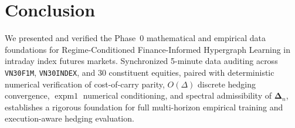 \section{Conclusion}
\label{sec:conclusion}

We presented and verified the Phase~0 mathematical and empirical data foundations for Regime-Conditioned Finance-Informed Hypergraph Learning in intraday index futures markets. Synchronized 5-minute data auditing across \texttt{VN30F1M}, \texttt{VN30INDEX}, and 30 constituent equities, paired with deterministic numerical verification of cost-of-carry parity, $O(\Delta)$ discrete hedging convergence, $\operatorname{expm1}$ numerical conditioning, and spectral admissibility of $\boldsymbol{\Delta}_n$, establishes a rigorous foundation for full multi-horizon empirical training and execution-aware hedging evaluation.
